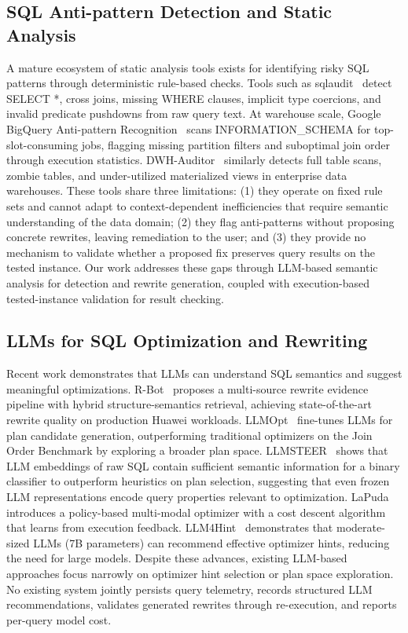 \documentclass[conference]{IEEEtran}
\begin{document}
\subsection{SQL Anti-pattern Detection and Static Analysis}
A mature ecosystem of static analysis tools exists for identifying risky SQL patterns through deterministic rule-based checks. Tools such as sqlaudit~\cite{sqlaudit} detect SELECT *, cross joins, missing WHERE clauses, implicit type coercions, and invalid predicate pushdowns from raw query text. At warehouse scale, Google BigQuery Anti-pattern Recognition~\cite{gcpantipattern} scans INFORMATION\_SCHEMA for top-slot-consuming jobs, flagging missing partition filters and suboptimal join order through execution statistics. DWH-Auditor~\cite{dwhauditor} similarly detects full table scans, zombie tables, and under-utilized materialized views in enterprise data warehouses. These tools share three limitations: (1) they operate on fixed rule sets and cannot adapt to context-dependent inefficiencies that require semantic understanding of the data domain; (2) they flag anti-patterns without proposing concrete rewrites, leaving remediation to the user; and (3) they provide no mechanism to validate whether a proposed fix preserves query results on the tested instance. Our work addresses these gaps through LLM-based semantic analysis for detection and rewrite generation, coupled with execution-based tested-instance validation for result checking.

\subsection{LLMs for SQL Optimization and Rewriting}
Recent work demonstrates that LLMs can understand SQL semantics and suggest meaningful optimizations. R-Bot~\cite{rbot2025} proposes a multi-source rewrite evidence pipeline with hybrid structure-semantics retrieval, achieving state-of-the-art rewrite quality on production Huawei workloads. LLMOpt~\cite{llmopt2025} fine-tunes LLMs for plan candidate generation, outperforming traditional optimizers on the Join Order Benchmark by exploring a broader plan space. LLMSTEER~\cite{llmsteer2024} shows that LLM embeddings of raw SQL contain sufficient semantic information for a binary classifier to outperform heuristics on plan selection, suggesting that even frozen LLM representations encode query properties relevant to optimization. LaPuda~\cite{lapuda2024} introduces a policy-based multi-modal optimizer with a cost descent algorithm that learns from execution feedback. LLM4Hint~\cite{llm4hint2025} demonstrates that moderate-sized LLMs (7B parameters) can recommend effective optimizer hints, reducing the need for large models. Despite these advances, existing LLM-based approaches focus narrowly on optimizer hint selection or plan space exploration. No existing system jointly persists query telemetry, records structured LLM recommendations, validates generated rewrites through re-execution, and reports per-query model cost.
\end{document}
